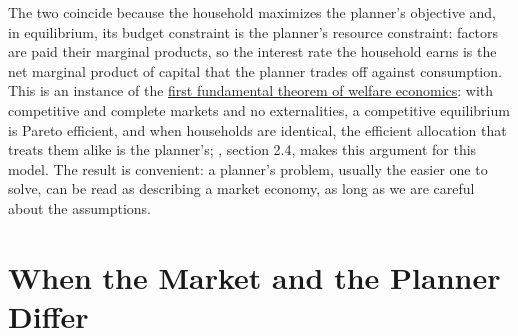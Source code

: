 \documentclass{econark}
\begin{document}
The two coincide because the household maximizes the planner's objective and, in equilibrium, its budget constraint is the planner's resource constraint: factors are paid their marginal products, so the interest rate the household earns is the net marginal product of capital that the planner trades off against consumption. This is an instance of the \href{https://en.wikipedia.org/wiki/Fundamental_theorems_of_welfare_economics\#First_Fundamental_Theorem}{first fundamental theorem of welfare economics}: with competitive and complete markets and no externalities, a competitive equilibrium is Pareto efficient, and when households are identical, the efficient allocation that treats them alike is the planner's; \citet{romer:text}, section 2.4, makes this argument for this model. The result is convenient: a planner's problem, usually the easier one to solve, can be read as describing a market economy, as long as we are careful about the assumptions.

\section{When the Market and the Planner Differ}
\end{document}
